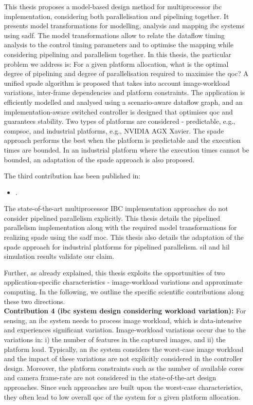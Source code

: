 This thesis proposes a model-based design method for multiprocessor \gls{ibc} implementation, considering both parallelisation and pipelining together. It presents model transformations for modelling, analysis
and mapping \gls{ibc} systems using \gls{sadf}. The model transformations allow to relate the dataflow timing analysis to the control timing parameters and to optimise the mapping while considering pipelining and parallelism together.
In this thesis, the particular problem we address is: For a given platform allocation, what is the optimal degree of pipelining and degree of parallelisation required to maximise the \gls{qoc}?
A unified \gls{spade} algorithm is proposed that takes into account image-workload variations, inter-frame dependencies and platform constraints.
The application is efficiently modelled and analysed using a scenario-aware dataflow graph, and an implementation-aware switched controller is designed that optimises \gls{qoc} and guarantees stability.
Two types of platforms are considered - predictable, e.g., \gls{compsoc}, and industrial platforms, e.g., NVIDIA AGX Xavier.
The \gls{spade} approach performs the best when the platform is predictable and the execution times are bounded. 
In an industrial platform where the execution times cannot be bounded, an adaptation of the \gls{spade} approach is also proposed. 

The third contribution has been published in:
\begin{itemize}
    \item {}.
\end{itemize}
The state-of-the-art multiprocessor IBC implementation approaches do not consider pipelined parallelism explicitly. This thesis details the pipelined parallelism implementation along with the required model transformations for realizing \gls{spade} using the \gls{sadf} \gls{moc}.
This thesis also details the adaptation of the \gls{spade} approach for industrial platforms for pipelined parallelism. \gls{sil} and \gls{hil} simulation results validate our claim.

Further, as already explained, this thesis exploits the opportunities of two appli\-cation-specific characteristics - image-workload variations and approximate computing. In the following, we outline the specific scientific contributions along these two directions. 
\\[1ex] 
\noindent
\textbf{Contribution 4 (\gls{ibc} system design considering workload variation):} For sensing, an \gls{ibc} system needs to process image workload, which is data-intensive and experiences significant variation. Image-workload variations occur due to the variations in: i) the number of features in the captured images, and ii) the platform load. Typically, an \gls{ibc} system considers the worst-case image workload \cite{saidi2018future} and the impact of these variations are not explicitly considered in the controller design. Moreover, the platform constraints such as the number of available cores and camera frame-rate are not considered in the state-of-the-art design approaches. Since such approaches are built upon the worst-case characteristics, they often lead to low overall \gls{qoc} of the system for a given platform allocation. 

